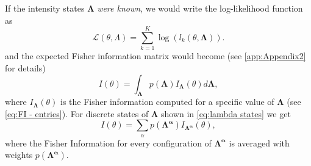 If the intensity states $\bm{\Lambda}$ \emph{were known}, we would write the log-likelihood function as 
%
\begin{equation}
	\mathcal{L}(\theta,\Lambda)=\sum_{k=1}^K\log\left(l_k(\theta,\bm{\Lambda})\right).
\end{equation}
%
and the expected Fisher information matrix would become (see \autoref{app:Appendix2} for details)
%
\begin{equation*}
	I(\theta) = \int_{\bm{\Lambda}}p(\bm{\Lambda})I_{\bm{\Lambda}}(\theta)d\bm{\Lambda},
\end{equation*}
%
where $I_{\bm{\Lambda}}(\theta)$ is the Fisher information computed for a specific value of $\bm{\Lambda}$ (see \autoref{eq:FI - entries}).
%
For discrete states of $\bm{\Lambda}$ shown in \autoref{eq:lambda states} we get
%
\begin{equation}
	I(\theta)=\sum_{\alpha}p(\bm{\Lambda^\alpha})I_{\bm{\Lambda^\alpha}}(\theta),
	\label{eq:FI avg}
\end{equation}
%
where the Fisher Information for every configuration of $\bm{\Lambda^\alpha}$ is averaged with weights $p(\bm{\Lambda^\alpha})$. 




